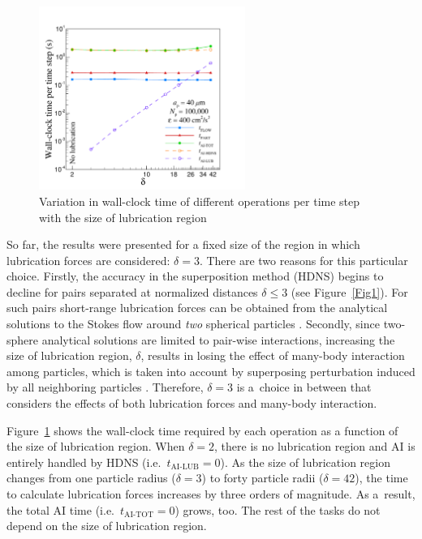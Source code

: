 \documentclass[../thesis.tex]{subfiles}
\begin{document}
\begin{figure}%
\centering
\includegraphics[trim=5mm 0mm 20mm 15mm, clip, width=0.6\textwidth]{./figs/PPAM/5/CP022_fig5.pdf}
\caption{Variation in wall-clock time of different operations per time step with the size of lubrication region}
\label{delta}
\end{figure}%

So far, the results were presented for a fixed size of the region in which lubrication forces are considered: $\delta=3$. There are two reasons for this particular choice. Firstly, the accuracy in the superposition method (HDNS) begins to decline for pairs separated at normalized distances $\delta\leq3$ (see Figure~\ref{Fig1}). For such pairs short-range lubrication forces can be obtained from the analytical solutions to the Stokes flow around \textit{two} spherical particles \citep{JO84}. Secondly, since two-sphere analytical solutions are limited to pair-wise interactions, increasing the size of lubrication region, $\delta$, results in losing the effect of many-body interaction among particles, which is taken into account by superposing perturbation induced by all neighboring particles \citep{WAG05,AGW07}. Therefore, $\delta=3$ is a~choice in between that considers the effects of both lubrication forces and many-body interaction.

Figure~\ref{delta} shows the wall-clock time required by each operation as a function of the size of lubrication region. When $\delta=2$, there is no lubrication region and AI is entirely handled by HDNS (i.e.~$t_\text{AI-LUB}=0$). As the size of lubrication region changes from one particle radius ($\delta=3$) to forty particle radii ($\delta=42$), the time to calculate lubrication forces increases by three orders of magnitude. As a~result, the total AI time (i.e.~$t_\text{AI-TOT}=0$) grows, too. The rest of the tasks do not depend on the size of lubrication region.
\end{document}
